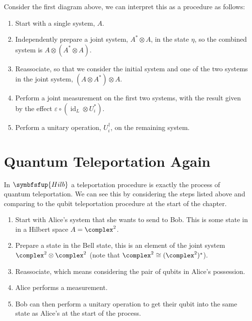 \documentclass[fleqn]{NotesClass}
\makeatletter
\newcommand{\c@egory}[1]{\symbfsfup{#1}}
\newcommand{\Hilb}{\c@egory{Hilb}}
\DeclareMathOperator{\id}{id}
\newcommand{\isomorphic}{\cong}
\makeatother
\begin{document}
    Consider the first diagram above, we can interpret this as a procedure as follows:
    \begin{enumerate}
        \item Start with a single system, \(A\).
        \item Independently prepare a joint system, \(A^* \otimes A\), in the state \(\eta\), so the combined system is \(A \otimes (A^* \otimes A)\).
        \item Reassociate, so that we consider the initial system and one of the two systems in the joint system, \((A \otimes A^*) \otimes A\).
        \item Perform a joint measurement on the first two systems, with the result given by the effect \(\varepsilon \circ ({\id_L} \otimes U_i^*)\).
        \item Perform a unitary operation, \(U_i^\dagger\), on the remaining system.
    \end{enumerate}
    
    \section{Quantum Teleportation Again}
    In \(\Hilb\) a teleportation procedure is exactly the process of quantum teleportation.
    We can see this by considering the steps listed above and comparing to the qubit teleportation procedure at the start of the chapter.
    \begin{enumerate}
        \item Start with Alice's system that she wants to send to Bob.
        This is some state in in a Hilbert space \(A = \complex^2\).
        \item Prepare a state in the Bell state, this is an element of the joint system \(\complex^2 \otimes \complex^2\) (note that \(\complex^2 \isomorphic (\complex^2)^*\)).
        \item Reassociate, which means considering the pair of qubits in Alice's possession.
        \item Alice performs a measurement.
        \item Bob can then perform a unitary operation to get their qubit into the same state as Alice's at the start of the process.
    \end{enumerate}
    
\end{document}
